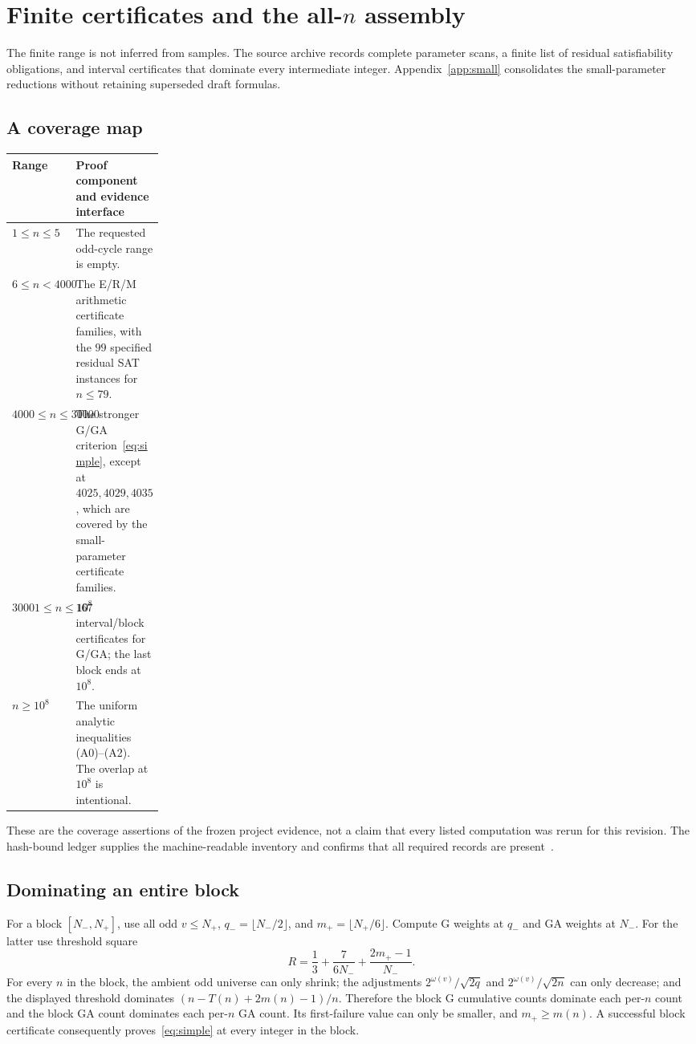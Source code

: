 \section{Finite certificates and the all-$n$ assembly}\label{sec:finite}
The finite range is not inferred from samples. The source archive records complete parameter scans, a finite list of residual satisfiability obligations, and interval certificates that dominate every intermediate integer. Appendix~\ref{app:small} consolidates the small-parameter reductions without retaining superseded draft formulas.

\subsection{A coverage map}
\begin{center}
\small
\begin{tabularx}{\linewidth}{@{}p{0.22\linewidth}X@{}}
\toprule
Range & Proof component and evidence interface\\
\midrule
$1\le n\le5$ & The requested odd-cycle range is empty.\\[3pt]
$6\le n<4000$ & The E/R/M arithmetic certificate families, with the $99$ specified residual SAT instances for $n\le79$.\\[3pt]
$4000\le n\le30000$ & The stronger G/GA criterion~\eqref{eq:simple}, except at $4025,4029,4035$, which are covered by the small-parameter certificate families.\\[3pt]
$30001\le n\le10^8$ & $167$ interval/block certificates for G/GA; the last block ends at $10^8$.\\[3pt]
$n\ge10^8$ & The uniform analytic inequalities (A0)--(A2). The overlap at $10^8$ is intentional.\\
\bottomrule
\end{tabularx}
\end{center}
These are the coverage assertions of the frozen project evidence, not a claim that every listed computation was rerun for this revision. The hash-bound ledger supplies the machine-readable inventory and confirms that all required records are present~\cite{Archive}.

\subsection{Dominating an entire block}
For a block $[N_-,N_+]$, use all odd $v\le N_+$, $q_-=\lfloor N_-/2\rfloor$, and $m_+=\lfloor N_+/6\rfloor$. Compute G weights at $q_-$ and GA weights at $N_-$. For the latter use threshold square
\[
 R=\frac13+\frac7{6N_-}+\frac{2m_+-1}{N_-}.
\]
For every $n$ in the block, the ambient odd universe can only shrink; the adjustments $2^{\omega(v)}/\sqrt{2q}$ and $2^{\omega(v)}/\sqrt{2n}$ can only decrease; and the displayed threshold dominates $(n-T(n)+2m(n)-1)/n$. Therefore the block G cumulative counts dominate each per-$n$ count and the block GA count dominates each per-$n$ GA count. Its first-failure value can only be smaller, and $m_+\ge m(n)$. A successful block certificate consequently proves~\eqref{eq:simple} at every integer in the block.

